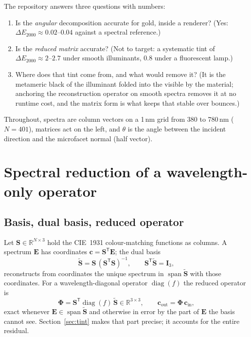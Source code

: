 \documentclass[11pt,a4paper]{article}
\newcommand{\mS}{\mathbf{S}}
\newcommand{\mSd}{\tilde{\mathbf{S}}}
\newcommand{\mPhi}{\boldsymbol{\Phi}}
\newcommand{\mI}{\mathbf{I}}
\newcommand{\vc}{\mathbf{c}}
\newcommand{\vE}{\mathbf{E}}
\newcommand{\diag}{\operatorname{diag}}
\newcommand{\dE}{\Delta E_{2000}}
\newcommand{\transp}{^{\mathsf{T}}}
\begin{document}
The repository answers three questions with numbers:
\begin{enumerate}[nosep]
  \item Is the \emph{angular} decomposition accurate for gold, inside a
        renderer?  (Yes: $\dE\approx0.02$--$0.04$ against a spectral
        reference.)
  \item Is the \emph{reduced matrix} accurate?  (Not to target: a systematic
        tint of $\dE\approx2$--$2.7$ under smooth illuminants, $0.8$ under a
        fluorescent lamp.)
  \item Where does that tint come from, and what would remove it?  (It is the
        metameric black of the illuminant folded into the visible by the
        material; anchoring the reconstruction operator on smooth spectra
        removes it at no runtime cost, and the matrix form is what keeps that
        stable over bounces.)
\end{enumerate}
Throughout, spectra are column vectors on a 1\,nm grid from 380 to 780\,nm
($N=401$), matrices act on the left, and $\theta$ is the angle between the
incident direction and the microfacet normal (half vector).

\section{Spectral reduction of a wavelength-only operator}
\label{sec:reduction}

\subsection{Basis, dual basis, reduced operator}

Let $\mS\in\mathbb{R}^{N\times3}$ hold the CIE~1931 colour-matching functions
as columns.  A spectrum $\vE$ has coordinates $\vc=\mS\transp\vE$; the dual
basis
\begin{equation}
  \mSd=\mS\,(\mS\transp\mS)^{-1},\qquad \mS\transp\mSd=\mI_3,
  \label{eq:dual}
\end{equation}
reconstructs from coordinates the unique spectrum in $\operatorname{span}\mSd$
with those coordinates.  For a wavelength-diagonal operator $\diag(f)$ the
reduced operator is
\begin{equation}
  \mPhi=\mS\transp\diag(f)\,\mSd\in\mathbb{R}^{3\times3},
  \qquad \vc_{\text{out}}=\mPhi\,\vc_{\text{in}},
  \label{eq:reduce}
\end{equation}
exact whenever $\vE\in\operatorname{span}\mSd$ and otherwise in error by the
part of $\vE$ the basis cannot see.  Section~\ref{sec:tint} makes that part
precise; it accounts for the entire residual.
\end{document}
